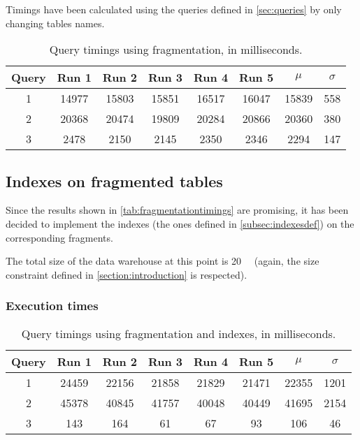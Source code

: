 Timings have been calculated using the queries defined in \autoref{sec:queries} by only changing tables names.

\begin{table}[!h]
\centering
\begin{tabular}{|| c | c c c c c | c c ||} 
 \hline
 Query & Run 1 & Run 2 & Run 3 & Run 4 & Run 5 & 	$\mu$ & $\sigma$ \\ [0.5ex] 
 \hline\hline
 1 & 14977 & 15803 & 15851 & 16517 & 16047 & 15839 & 558 \\ 
 \hline
 2 & 20368 & 20474 & 19809 & 20284 & 20866 & 20360 & 380 \\
 \hline
 3 & 2478 & 2150 & 2145 & 2350 & 2346 & 2294 & 147 \\
 \hline
\end{tabular}
  \caption{Query timings using fragmentation, in milliseconds.}
  \label{tab:fragmentationtimings}
\end{table}



\subsection{Indexes on fragmented tables}

Since the results shown in \autoref{tab:fragmentationtimings} are promising, it has been decided to implement the indexes (the ones defined in \autoref{subsec:indexesdef}) on the corresponding fragments.

The total size of the data warehouse at this point is \SI{20}{\giga\byte} (again, the size constraint defined in \autoref{section:introduction} is respected).


\subsubsection{Execution times}


\begin{table}[!h]
\centering
\begin{tabular}{|| c | c c c c c | c c ||} 
 \hline
 Query & Run 1 & Run 2 & Run 3 & Run 4 & Run 5 & 	$\mu$ & $\sigma$ \\ [0.5ex] 
 \hline\hline
 1 & 24459 & 22156 & 21858 & 21829 & 21471 & 22355 & 1201 \\ 
 \hline
 2 & 45378 & 40845 & 41757 & 40048 & 40449 & 41695 & 2154 \\
 \hline
 3 & 143 & 164 & 61 & 67 & 93 & 106 & 46 \\
 \hline
\end{tabular}
  \caption{Query timings using fragmentation and indexes, in milliseconds.}
  \label{tab:fragmentationindexestimings}
\end{table}
